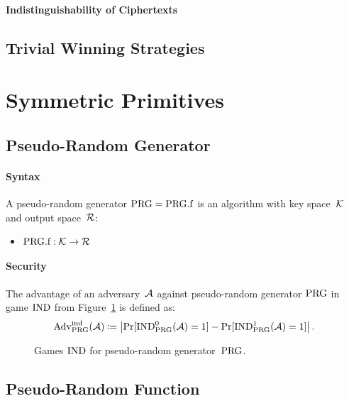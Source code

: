 \documentclass[a4paper,orivec]{llncs}
\begin{document}
\paragraph{Indistinguishability of Ciphertexts}

\subsection{Trivial Winning Strategies}


\section{Symmetric Primitives}


\subsection{Pseudo-Random Generator}


\paragraph{Syntax}
A pseudo-random generator $\mathrm{PRG}=\mathrm{PRG}.\mathrm{f}$ is an algorithm with key space~$\mathcal{K}$ and output space~$\mathcal{R}$:

\begin{itemize}
    \item $\mathrm{PRG}.\mathrm{f}: \mathcal{K} \to \mathcal{R}$
\end{itemize}

\paragraph{Security}
The advantage of an adversary~$\mathcal{A}$ against pseudo-random generator $\mathrm{PRG}$ in game ${\mathrm{IND}}$ from Figure~\ref{fig:prg:ind} is defined as:
\[
\mathrm{Adv}_{\mathrm{PRG}}^{\mathrm{ind}}(\mathcal{A})\coloneqq\left|\Pr[{\mathrm{IND}}_{\mathrm{PRG}}^0(\mathcal{A})=1]-\Pr[{\mathrm{IND}}_{\mathrm{PRG}}^1(\mathcal{A})=1]\right|\text{.}
\]

\begin{figure}[!ht]
    \centering
    \nicoresetlinenr%
    \fbox{%
        \scalebox{\codescalefactor}{%
        }%
    }
    \caption{%
        Games ${\mathrm{IND}}$ for pseudo-random generator~$\mathrm{PRG}$.
    }
    \label{fig:prg:ind}
\end{figure}

\subsection{Pseudo-Random Function}
\end{document}
